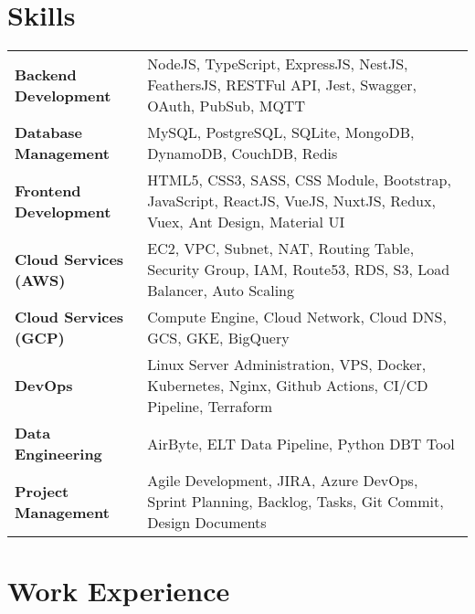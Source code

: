 \documentclass {article}
\begin{document}
\section{Skills}
\begin{tabularx}{\linewidth}{@{}l X@{}}
  \textbf{Backend Development} & NodeJS, TypeScript, ExpressJS, NestJS, FeathersJS, RESTFul API, Jest, Swagger, OAuth, PubSub, MQTT\\
  \textbf{Database Management} & MySQL, PostgreSQL, SQLite, MongoDB, DynamoDB, CouchDB, Redis\\ 
  \textbf{Frontend Development} & HTML5, CSS3, SASS, CSS Module, Bootstrap, JavaScript, ReactJS, VueJS, NuxtJS, Redux, Vuex, Ant Design, Material UI\\ 
  \textbf{Cloud Services (AWS)} & EC2, VPC, Subnet, NAT, Routing Table, Security Group, IAM, Route53, RDS, S3, Load Balancer, Auto Scaling\\ 
  \textbf{Cloud Services (GCP)} & Compute Engine, Cloud Network, Cloud DNS, GCS, GKE, BigQuery\\
  \textbf{DevOps} & Linux Server Administration, VPS, Docker, Kubernetes, Nginx, Github Actions, CI/CD Pipeline, Terraform\\
  \textbf{Data Engineering} & AirByte, ELT Data Pipeline, Python DBT Tool\\
  \textbf{Project Management} & Agile Development, JIRA, Azure DevOps, Sprint Planning, Backlog, Tasks, Git Commit, Design Documents\\
\end{tabularx}

\section{Work Experience}
\end{document}

